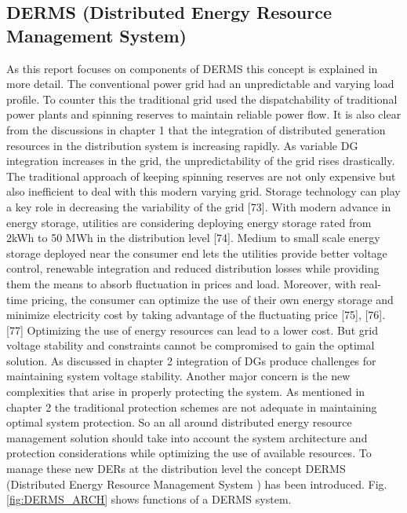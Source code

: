 \subsection{DERMS (Distributed Energy Resource Management System)}
As this report focuses on components of DERMS this concept is explained in more detail. The conventional power grid had an unpredictable and varying load profile. To counter this the traditional grid used the dispatchability of traditional power plants and spinning reserves to maintain reliable power flow. It is also clear from the discussions in chapter 1 that the integration of distributed generation resources in the distribution system is increasing rapidly. As variable DG integration increases in the grid, the unpredictability of the grid rises drastically. The traditional approach of keeping spinning reserves are not only expensive but also inefficient to deal with this modern varying grid. Storage technology can play a key role in decreasing the variability of the grid [73]. With modern advance in energy storage, utilities are considering deploying energy storage rated from 2kWh to 50 MWh in the distribution level [74]. Medium to small scale energy storage deployed near the consumer end lets the utilities provide better voltage control, renewable integration and reduced distribution losses while providing them the means to absorb fluctuation in prices and load. Moreover, with real-time pricing, the consumer can optimize the use of their own energy storage and minimize electricity cost by taking advantage of the fluctuating price [75], [76]. [77]
Optimizing the use of energy resources can lead to a lower cost. But grid voltage stability and constraints cannot be compromised to gain the optimal solution. As discussed in chapter 2 integration of DGs produce challenges for maintaining system voltage stability. Another major concern is the new complexities that arise in properly protecting the system. As mentioned in chapter 2 the traditional protection schemes are not adequate in maintaining optimal system protection. 
So an all around distributed energy resource management solution should take into account the system architecture and protection considerations while optimizing the use of available resources.
To manage these new DERs at the distribution level the concept DERMS (Distributed Energy Resource Management System
) has been introduced. Fig. \ref{fig:DERMS_ARCH} shows functions of a DERMS system. 

